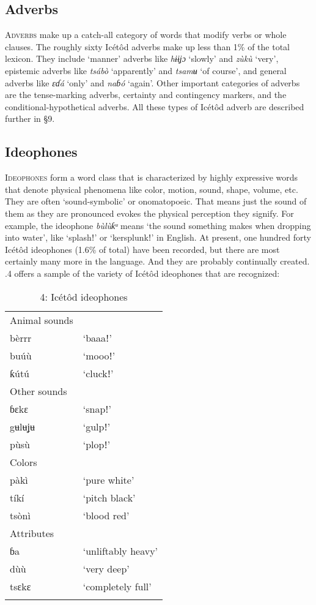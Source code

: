 \subsection{Adverbs}


\textsc{Adverbs} make up a catch-all category of words that modify verbs or whole clauses. The roughly sixty Icétôd adverbs make up less than 1\% of the total lexicon. They include ‘manner’ adverbs like \textit{hɨɨʝɔ} ‘slowly’ and \textit{zùkù} ‘very’, epistemic adverbs like \textit{tsábò} ‘apparently’ and \textit{tsamʉ} ‘of course’, and general adverbs like \textit{ɛɗá} ‘only’ and \textit{naɓó} ‘again’. Other important categories of adverbs are the tense-marking adverbs, certainty and contingency markers, and the conditional-hypothetical adverbs. All these types of Icétôd adverb are described further in §9.




\subsection{Ideophones}


\textsc{Ideophones} form a word class that is characterized by highly expressive words that denote physical phenomena like color, motion, sound, shape, volume, etc. They are often ‘sound-symbolic’ or onomatopoeic. That means just the sound of them as they are pronounced evokes the physical perception they signify. For example, the ideophone \textit{bùlùƙᵘ} means ‘the sound something makes when dropping into water’, like ‘splashǃ’ or ‘kersplunkǃ’ in English. At present, one hundred forty Icétôd ideophones (1.6\% of total) have been recorded, but there are most certainly many more in the language. And they are probably continually created. .4 offers a sample of the variety of Icétôd ideophones that are recognized:


\begin{table}
\caption{4: Icétôd ideophones}
\label{tab:3}


\begin{tabularx}{\textwidth}{XX}
\lsptoprule

Animal sounds & \\
bèrrr & ‘baaaǃ’\\
buúù & ‘moooǃ’\\
ƙútú & ‘cluckǃ’\\
Other sounds & \\
ɓɛkɛ & ‘snapǃ’\\
gʉlʉʝʉ & ‘gulpǃ’\\
pùsù & ‘plopǃ’\\
Colors & \\
pàkì & ‘pure white’\\
tíkí & ‘pitch black’\\
tsònì & ‘blood red’\\
Attributes & \\
ɓa & ‘unliftably heavy’\\
dùù & ‘very deep’\\
tsɛkɛ & ‘completely full’\\
\lspbottomrule
\end{tabularx}
\end{table}




